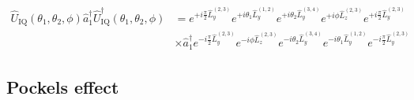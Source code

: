 \begin{equation}
	\begin{split}
		\hat{U}_\text{IQ}(\theta_1,\theta_2,\phi)
		\hat{a}_1^\dagger
		\hat{U}_\text{IQ}^\dagger(\theta_1,\theta_2,\phi)
		&=
		e^{+i\frac{\pi}{2}\hat{L}_y^{(2,3)}}
		e^{+i\theta_1\hat{L}_y^{(1,2)}}
		e^{+i\theta_2\hat{L}_y^{(3,4)}}
		e^{+i\phi\hat{L}_z^{(2,3)}}
		e^{+i\frac{\pi}{2}\hat{L}_y^{(2,3)}}
		\\
		&\times
		\hat{a}_1^\dagger
		e^{-i\frac{\pi}{2}\hat{L}_y^{(2,3)}}
		e^{-i\phi\hat{L}_z^{(2,3)}}
		e^{-i\theta_2\hat{L}_y^{(3,4)}}
		e^{-i\theta_1\hat{L}_y^{(1,2)}}
		e^{-i\frac{\pi}{2}\hat{L}_y^{(2,3)}}
	\end{split}
\end{equation}

\subsection{Pockels effect}


